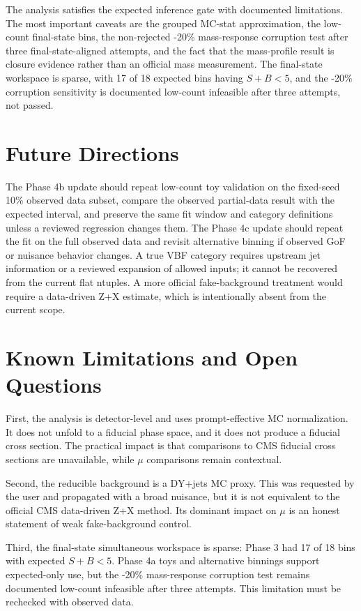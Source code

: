 \documentclass[11pt]{article}
\begin{document}
The analysis satisfies the expected inference gate with documented limitations. The most important caveats are the grouped MC-stat approximation, the low-count final-state bins, the non-rejected -20\% mass-response corruption test after three final-state-aligned attempts, and the fact that the mass-profile result is closure evidence rather than an official mass measurement. The final-state workspace is sparse, with 17 of 18 expected bins having $S+B<5$, and the -20\% corruption sensitivity is documented low-count infeasible after three attempts, not passed.
\section{Future Directions}
The Phase 4b update should repeat low-count toy validation on the fixed-seed 10\% observed data subset, compare the observed partial-data result with the expected interval, and preserve the same fit window and category definitions unless a reviewed regression changes them. The Phase 4c update should repeat the fit on the full observed data and revisit alternative binning if observed GoF or nuisance behavior changes. A true VBF category requires upstream jet information or a reviewed expansion of allowed inputs; it cannot be recovered from the current flat ntuples. A more official fake-background treatment would require a data-driven Z+X estimate, which is intentionally absent from the current scope.
\section{Known Limitations and Open Questions}
First, the analysis is detector-level and uses prompt-effective MC normalization. It does not unfold to a fiducial phase space, and it does not produce a fiducial cross section. The practical impact is that comparisons to CMS fiducial cross sections are unavailable, while $\mu$ comparisons remain contextual.

Second, the reducible background is a DY+jets MC proxy. This was requested by the user and propagated with a broad nuisance, but it is not equivalent to the official CMS data-driven Z+X method. Its dominant impact on $\mu$ is an honest statement of weak fake-background control.

Third, the final-state simultaneous workspace is sparse: Phase 3 had 17 of 18 bins with expected $S+B<5$. Phase 4a toys and alternative binnings support expected-only use, but the -20\% mass-response corruption test remains documented low-count infeasible after three attempts. This limitation must be rechecked with observed data.
\end{document}
